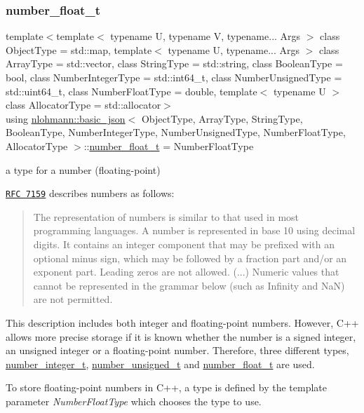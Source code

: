 \subsubsection{\texorpdfstring{number\+\_\+float\+\_\+t}{number\_float\_t}}
{\footnotesize\ttfamily template$<$template$<$ typename U, typename V, typename... Args $>$ class Object\+Type = std\+::map, template$<$ typename U, typename... Args $>$ class Array\+Type = std\+::vector, class String\+Type  = std\+::string, class Boolean\+Type  = bool, class Number\+Integer\+Type  = std\+::int64\+\_\+t, class Number\+Unsigned\+Type  = std\+::uint64\+\_\+t, class Number\+Float\+Type  = double, template$<$ typename U $>$ class Allocator\+Type = std\+::allocator$>$ \\
using \hyperlink{classnlohmann_1_1basic__json}{nlohmann\+::basic\+\_\+json}$<$ Object\+Type, Array\+Type, String\+Type, Boolean\+Type, Number\+Integer\+Type, Number\+Unsigned\+Type, Number\+Float\+Type, Allocator\+Type $>$\+::\hyperlink{classnlohmann_1_1basic__json_a74a0013e847fdc574b48f931f0e757e1}{number\+\_\+float\+\_\+t} =  Number\+Float\+Type}



a type for a number (floating-\/point) 

\href{http://rfc7159.net/rfc7159}{\tt R\+FC 7159} describes numbers as follows\+: \begin{quote}
The representation of numbers is similar to that used in most programming languages. A number is represented in base 10 using decimal digits. It contains an integer component that may be prefixed with an optional minus sign, which may be followed by a fraction part and/or an exponent part. Leading zeros are not allowed. (...) Numeric values that cannot be represented in the grammar below (such as Infinity and NaN) are not permitted. \end{quote}


This description includes both integer and floating-\/point numbers. However, C++ allows more precise storage if it is known whether the number is a signed integer, an unsigned integer or a floating-\/point number. Therefore, three different types, \hyperlink{classnlohmann_1_1basic__json_ac4b10b2364f26ce47bdb9a413ff04a59}{number\+\_\+integer\+\_\+t}, \hyperlink{classnlohmann_1_1basic__json_a60a04166c122072ab11eaf9845d9cd1d}{number\+\_\+unsigned\+\_\+t} and \hyperlink{classnlohmann_1_1basic__json_a74a0013e847fdc574b48f931f0e757e1}{number\+\_\+float\+\_\+t} are used.

To store floating-\/point numbers in C++, a type is defined by the template parameter {\itshape Number\+Float\+Type} which chooses the type to use.


